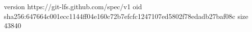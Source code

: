 version https://git-lfs.github.com/spec/v1
oid sha256:647664c001ecc1144ff04e160c72b7efcfc1247107ed5802f78edadb27baf08c
size 43840
